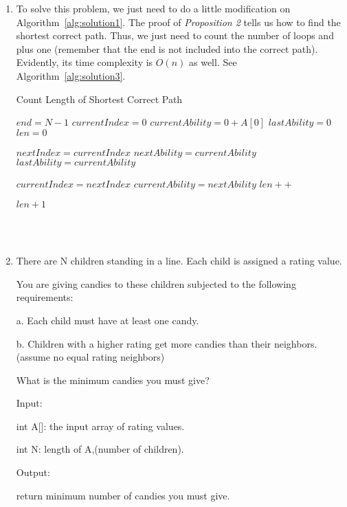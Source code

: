 \documentclass[12pt,a4paper]{article}
\makeatletter
\newtheorem*{solution}{Solution}
\renewenvironment{solution}[1][Solution] {\par\pushQED{\qed}\normalfont\topsep6\p@\@plus6\p@\relax\trivlist\item[\hskip\labelsep\bfseries#1\@addpunct{.}]\ignorespaces}{\popQED\endtrivlist\@endpefalse} \makeatother
\makeatother
\begin{document}
\begin{enumerate}
\begin{solution}

To solve this problem, we just need to do a little modification on Algorithm~\ref{alg:solution1}. The proof of \emph{Proposition 2} tells us how to find the shortest correct path. Thus, we just need to count the number of loops and plus one (remember that the end is not included into the correct path). Evidently, its time complexity is $O(n)$ as well. See Algorithm~\ref{alg:solution3}.

\begin{algorithm} 
  \label{alg:solution3}
  \caption{Count Length of Shortest Correct Path} 
  $end = N-1$\; 
  $currentIndex = 0$\;
  $currentAbility = 0 + A[0]$\; 
  $lastAbility = 0$\;  
  $len = 0$\;
  { 
    $nextIndex = currentIndex$\;
    $nextAbility = currentAbility$\;
    $lastAbility = currentAbility$\;
    
    $currentIndex = nextIndex$\;
    $currentAbility = nextAbility$\;
    $len++$\;  
  } 
  \Return $len+1$\; 
\end{algorithm}

\end{solution}
~\\
~\\

\item There are N children standing in a line. Each child is assigned a rating value.

You are giving candies to these children subjected to the following requirements:

a. Each child must have at least one candy.

b. Children with a higher rating get more candies than their neighbors.(assume no equal rating neighbors)

What is the minimum candies you must give?

Input:

int A[]: the input array of rating values.

int N: length of A,(number of children).

Output:

return minimum number of candies you must give.


\end{enumerate}
\end{document}
